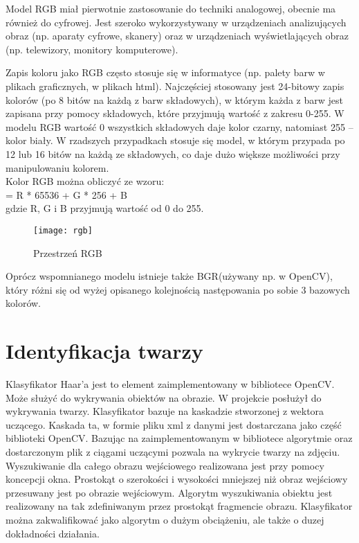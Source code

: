\documentclass[eng,printmode]{mgr}
\begin{document}
Model RGB miał pierwotnie zastosowanie do techniki analogowej, obecnie ma również do cyfrowej. Jest szeroko wykorzystywany w urządzeniach analizujących obraz (np. aparaty cyfrowe, skanery) oraz w urządzeniach wyświetlających obraz (np. telewizory, monitory komputerowe).

Zapis koloru jako RGB często stosuje się w informatyce (np. palety barw w plikach graficznych, w plikach html). Najczęściej stosowany jest 24-bitowy zapis kolorów (po 8 bitów na każdą z barw składowych), w którym każda z barw jest zapisana przy pomocy składowych, które przyjmują wartość z zakresu 0-255. W modelu RGB wartość 0 wszystkich składowych daje kolor czarny, natomiast 255 – kolor biały. W rzadszych przypadkach stosuje się model, w którym przypada po 12 lub 16 bitów na każdą ze składowych, co daje dużo większe możliwości przy manipulowaniu kolorem.\cite{wikirgb} \\
Kolor RGB można obliczyć ze wzoru:
\\
 = R * 65536 + G * 256 + B\\
gdzie R, G i B przyjmują wartość od 0 do 255.\\

\begin{figure}[placement h]
\texttt{[image: rgb]}
\caption{Przestrzeń RGB}
\end{figure}

Oprócz wspomnianego modelu istnieje także BGR(używany np. w OpenCV), który różni się od wyżej opisanego kolejnością następowania po sobie 3 bazowych kolorów.
\section{Identyfikacja twarzy}

Klasyfikator Haar'a jest to element zaimplementowany w bibliotece OpenCV. Może służyć do wykrywania obiektów na obrazie. W projekcie posłużył do wykrywania twarzy. Klasyfikator bazuje na kaskadzie stworzonej z wektora uczącego. Kaskada ta, w formie pliku xml z danymi jest dostarczana jako część biblioteki OpenCV. Bazując na zaimplementowanym w bibliotece algorytmie oraz dostarczonym plik z ciągami uczącymi pozwala na wykrycie twarzy na zdjęciu. Wyszukiwanie dla całego obrazu wejściowego realizowana jest przy pomocy koncepcji okna. Prostokąt o szerokości i wysokości mniejszej niż obraz wejściowy przesuwany jest po obrazie wejściowym. Algorytm wyszukiwania obiektu jest realizowany na tak zdefiniwanym przez prostokąt fragmencie obrazu. Klasyfikator można zakwalifikować jako algorytm o dużym obciążeniu, ale także o duzej dokładności działania.
\end{document}
